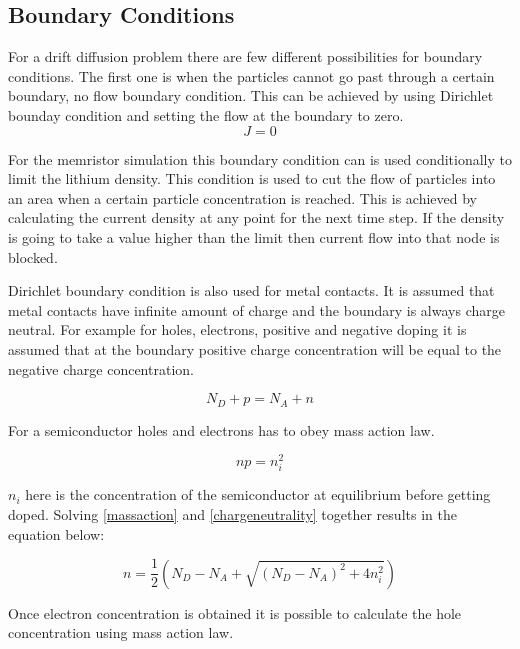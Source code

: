 \subsection{Boundary Conditions}

For a drift diffusion problem there are few different possibilities for boundary conditions. The first one is when the particles cannot go past through a certain boundary, no flow boundary condition. This can be achieved by using Dirichlet bounday condition and setting the flow at the boundary to zero. 
\begin{equation}
J=0
\end{equation}

For the memristor simulation this boundary condition can is used conditionally to limit the lithium density. This condition is used to cut the flow of particles into an area when a certain particle concentration is reached. This is achieved by calculating the current density at any point for the next time step. If the density is going to take a value higher than the limit then current flow into that node is blocked.

Dirichlet boundary condition is also used for metal contacts. It is assumed that metal contacts have infinite amount of charge and the boundary is always charge neutral. For example for holes, electrons, positive and negative doping it is assumed that at the boundary positive charge concentration will be equal to the negative charge concentration. 

\begin{equation}
N_{D} + p=N_{A} + n
\label{chargeneutrality}
\end{equation}

For a semiconductor holes and electrons has to obey mass action law.

\begin{equation}
np=n_i^2
\label{massaction}
\end{equation}

$n_i$ here is the concentration of the semiconductor at equilibrium before getting doped. Solving \eqref{massaction} and \eqref{chargeneutrality} together results in the equation below:

\begin{equation}
n=\frac{1}{2}(N_D - N_A + \sqrt{(N_D - N_A)^2+4n_i^2})
\label{nbound}
\end{equation}

Once electron concentration is obtained it is possible to calculate the hole concentration using mass action law.

